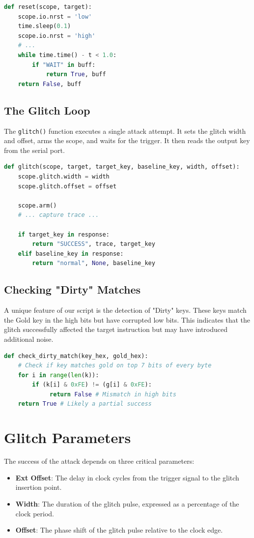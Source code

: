 \begin{lstlisting}[language=Python]
def reset(scope, target):
    scope.io.nrst = 'low'
    time.sleep(0.1)
    scope.io.nrst = 'high'
    # ...
    while time.time() - t < 1.0:
        if "WAIT" in buff:
            return True, buff
    return False, buff
\end{lstlisting}

\subsection{The Glitch Loop}
The \texttt{glitch()} function executes a single attack attempt. It sets the glitch width and offset, arms the scope, and waits for the trigger. It then reads the output key from the serial port.

\begin{lstlisting}[language=Python]
def glitch(scope, target, target_key, baseline_key, width, offset):
    scope.glitch.width = width
    scope.glitch.offset = offset
    
    scope.arm()
    # ... capture trace ...
    
    if target_key in response:
        return "SUCCESS", trace, target_key
    elif baseline_key in response:
        return "normal", None, baseline_key
\end{lstlisting}

\subsection{Checking "Dirty" Matches}
A unique feature of our script is the detection of "Dirty" keys. These keys match the Gold key in the high bits but have corrupted low bits. This indicates that the glitch successfully affected the target instruction but may have introduced additional noise.

\begin{lstlisting}[language=Python]
def check_dirty_match(key_hex, gold_hex):
    # Check if key matches gold on top 7 bits of every byte
    for i in range(len(k)):
        if (k[i] & 0xFE) != (g[i] & 0xFE):
             return False # Mismatch in high bits
    return True # Likely a partial success
\end{lstlisting}

\section{Glitch Parameters}
The success of the attack depends on three critical parameters:
\begin{itemize}
    \item \textbf{Ext Offset}: The delay in clock cycles from the trigger signal to the glitch insertion point.
    \item \textbf{Width}: The duration of the glitch pulse, expressed as a percentage of the clock period.
    \item \textbf{Offset}: The phase shift of the glitch pulse relative to the clock edge.
\end{itemize}

